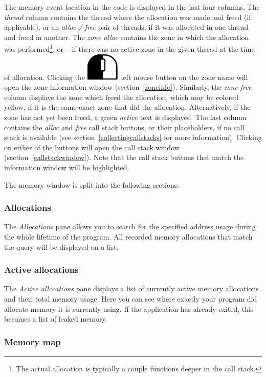 \documentclass[hidelinks,titlepage,a4paper]{article}
\newcommand{\LMB}{\includegraphics[height=.8\baselineskip]{icons/lmb}}
\begin{document}
The memory event location in the code is displayed in the last four columns. The \emph{thread} column contains the thread where the allocation was made and freed (if applicable), or an \emph{alloc / free} pair of threads, if it was allocated in one thread and freed in another. The \emph{zone alloc} contains the zone in which the allocation was performed\footnote{The actual allocation is typically a couple functions deeper in the call stack.}, or \texttt{-} if there was no active zone in the given thread at the time of allocation. Clicking the \LMB{}~left mouse button on the zone name will open the zone information window (section~\ref{zoneinfo}). Similarly, the \emph{zone free} column displays the zone which freed the allocation, which may be colored yellow, if it is the same exact zone that did the allocation. Alternatively, if the zone has not yet been freed, a green \emph{active} text is displayed. The last column contains the \emph{alloc} and \emph{free} call stack buttons, or their placeholders, if no call stack is available (see section~\ref{collectingcallstacks} for more information). Clicking on either of the buttons will open the call stack window (section~\ref{callstackwindow}). Note that the call stack buttons that match the information window will be highlighted.

The memory window is split into the following sections:

\subsubsection{Allocations}

The \emph{\faAt{} Allocations} pane allows you to search for the specified address usage during the whole lifetime of the program. All recorded memory allocations that match the query will be displayed on a list.

\subsubsection{Active allocations}

The \emph{\faHeartbeat{} Active allocations} pane displays a list of currently active memory allocations and their total memory usage. Here you can see where exactly your program did allocate memory it is currently using. If the application has already exited, this becomes a list of leaked memory.

\subsubsection{Memory map}
\end{document}

